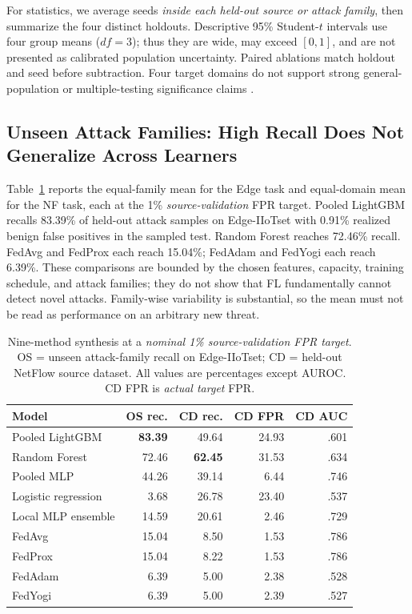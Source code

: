\documentclass[journal,10pt]{IEEEtran}
\begin{document}
For statistics, we average seeds \emph{inside each held-out source or attack family}, then summarize the four distinct holdouts. Descriptive 95\% Student-$t$ intervals use four group means ($df=3$); thus they are wide, may exceed $[0,1]$, and are not presented as calibrated population uncertainty. Paired ablations match holdout and seed before subtraction. Four target domains do not support strong general-population or multiple-testing significance claims \cite{demsar2006}.

\subsection{Unseen Attack Families: High Recall Does Not Generalize Across Learners}
Table~\ref{tab:all9} reports the equal-family mean for the Edge task and equal-domain mean for the NF task, each at the 1\% \emph{source-validation} FPR target. Pooled LightGBM recalls 83.39\% of held-out attack samples on Edge-IIoTset with 0.91\% realized benign false positives in the sampled test. Random Forest reaches 72.46\% recall. FedAvg and FedProx each reach 15.04\%; FedAdam and FedYogi each reach 6.39\%. These comparisons are bounded by the chosen features, capacity, training schedule, and attack families; they do not show that FL fundamentally cannot detect novel attacks. Family-wise variability is substantial, so the mean must not be read as performance on an arbitrary new threat.

\begin{table}[t]
\centering
\caption{Nine-method synthesis at a \emph{nominal 1\% source-validation FPR target}. OS = unseen attack-family recall on Edge-IIoTset; CD = held-out NetFlow source dataset. All values are percentages except AUROC. CD FPR is \emph{actual target} FPR.}
\label{tab:all9}
\scriptsize\setlength{\tabcolsep}{2.6pt}
\begin{tabular}{@{}lrrrr@{}}
\toprule
\textbf{Model} & \textbf{OS rec.} & \textbf{CD rec.} & \textbf{CD FPR} & \textbf{CD AUC}\\
\midrule
Pooled LightGBM & \textbf{83.39} & 49.64 & 24.93 & .601\\
Random Forest & 72.46 & \textbf{62.45} & 31.53 & .634\\
Pooled MLP & 44.26 & 39.14 & 6.44 & .746\\
Logistic regression & 3.68 & 26.78 & 23.40 & .537\\
Local MLP ensemble & 14.59 & 20.61 & 2.46 & .729\\
FedAvg & 15.04 & 8.50 & 1.53 & .786\\
FedProx & 15.04 & 8.22 & 1.53 & .786\\
FedAdam & 6.39 & 5.00 & 2.38 & .528\\
FedYogi & 6.39 & 5.00 & 2.39 & .527\\
\bottomrule
\end{tabular}
\end{table}
\end{document}

